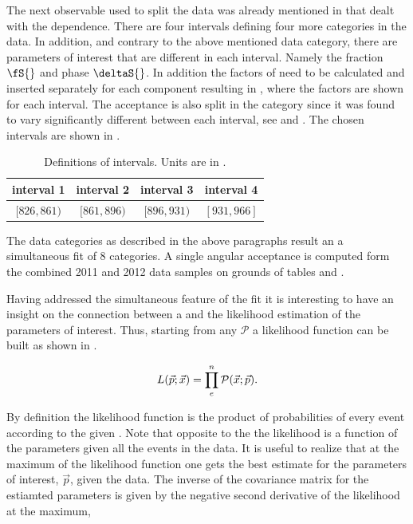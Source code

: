 The next observable used to split the data was already mentioned in  that dealt with the \mkpi dependence.
There are four \mkpi intervals defining four more categories in the data. In addition, and contrary to the above mentioned data category, there
are parameters of interest that are different in each \mkpi interval. Namely the \swave fraction $\fS{}$ and phase $\deltaS{}$.
In addition the \CSP factors of  need to be calculated and inserted separately for each component \pdf resulting in
, where the \CSP factors are shown for each \mkpi interval. The acceptance is also split in the \mkpi category since it was
found to vary significantly different between each \mkpi interval, see  and .
The chosen \mkpi intervals are shown in .

\begin{table}[!h]
\centering
\begin{tabular}{c c c c}
  \hline
  interval 1 & interval 2 & interval 3 & interval 4\\
  \hline
  $ [826,861) $ & $ [861,896) $ & $ [896,931) $ & $ [931,966] $ \\
  \hline
\end{tabular}
\caption{Definitions of \mkpi intervals. Units are in \mevcc.}
\label{Kbindef}
\end{table}

The data categories as described in the above paragraphs result an a simultaneous fit of 8 categories.
A single angular acceptance is computed form the combined 2011 and 2012 data samples on grounds of tables  and .

Having addressed the simultaneous feature of the fit it is interesting to have an insight on
the connection between a \pdf and the likelihood estimation of the parameters of interest. Thus, starting from
any \pdf $\mathcal{P}$ a likelihood function can be built as shown in .

\begin{equation}
  \centering
L(\vec{p};\vec{x}) = \prod_e^n \mathcal{P}(\vec{x};\vec{p}).
\label{likelihood}
\end{equation}

\noindent By definition the likelihood
function is the product of probabilities of every event according to the given \pdf. Note that opposite to the \pdf
the likelihood is a function of the parameters given all the events in the data. It is
useful to realize that at the maximum of the likelihood function one gets the best estimate for the parameters of
interest, $\vec{p}$, given the data. The inverse of the covariance matrix for the estiamted parameters is given
by the negative second derivative of the likelihood at the maximum,

